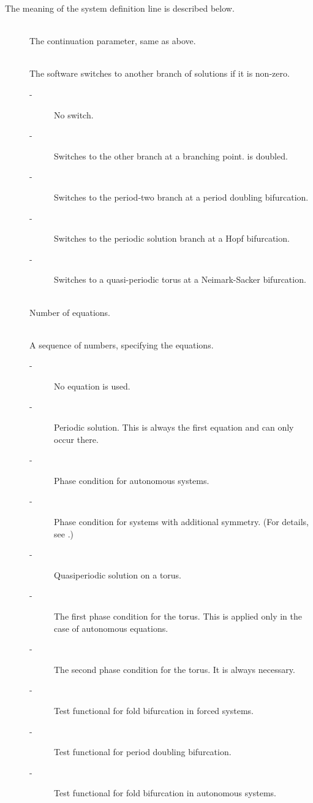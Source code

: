 \documentclass[10pt,a4paper]{ddedoc}
\begin{document}
The meaning of the system definition line is described below.
\begin{description}
\item[] ~\\
	The continuation parameter, same as above.
%
\item[] ~\\
	The software switches to another branch of solutions if it is non-zero.
\begin{description}
\item[ -] No switch.
\item[ -] Switches to the other branch at a branching point.  is doubled.
\item[ -] Switches to the period-two branch at a period doubling
bifurcation.
\item[ -] Switches to the periodic solution branch at a Hopf
bifurcation.
\item[ -] Switches to a quasi-periodic torus at a Neimark-Sacker
bifurcation.
\end{description}
\item[] ~\\
	Number of equations.
\item[] ~\\
	A sequence of numbers, specifying the equations.
\begin{description}
\item[ -] No equation is used.
\item[ -] Periodic solution. This is always the first equation and can
only occur there.
\item[ -] Phase condition for autonomous systems.
\item[ -] Phase condition for systems with additional symmetry. (For
details, see \cite{haegeman,roose-szalai}.)
\item[ -] Quasiperiodic solution on a torus.
\item[ -] The first phase condition for the torus. This is applied
only in the case of autonomous equations.
\item[ -] The second phase condition for the torus. It is always
necessary.
\item[ -] Test functional for fold bifurcation in forced systems.
\item[ -] Test functional for period doubling bifurcation.
\item[ -] Test functional for fold bifurcation in autonomous systems.

\end{description}
\end{description}
\end{document}
